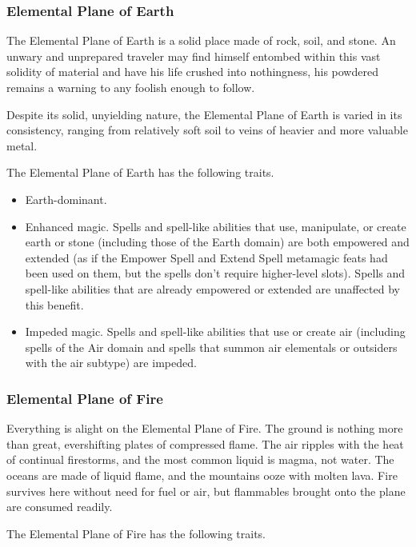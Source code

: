 \subsubsection{Elemental Plane of Earth}

The Elemental Plane of Earth is a solid place made of rock, soil, and stone. An 
unwary and unprepared traveler may find himself entombed within this vast solidity 
of material and have his life crushed into nothingness, his powdered remains a 
warning to any foolish enough to follow.

Despite its solid, unyielding nature, the Elemental Plane of Earth is varied in 
its consistency, ranging from relatively soft soil to veins of heavier and more 
valuable metal. 

The Elemental Plane of Earth has the following traits.

\begin{itemize}
\item Earth-dominant.
\item Enhanced magic. Spells and spell-like abilities that use, manipulate, or create 
earth or stone (including those of the Earth domain) are both empowered and extended 
(as if the Empower Spell and Extend Spell metamagic feats had been used on them, 
but the spells don't require higher-level slots). Spells and spell-like abilities 
that are already empowered or extended are unaffected by this benefit.
\item Impeded magic. Spells and spell-like abilities that use or create air (including 
spells of the Air domain and spells that summon air elementals or outsiders with 
the air subtype) are impeded.
\end{itemize}

\subsubsection{Elemental Plane of Fire}

Everything is alight on the Elemental Plane of Fire. The ground is nothing more 
than great, evershifting plates of compressed flame. The air ripples with the heat 
of continual firestorms, and the most common liquid is magma, not water. The oceans 
are made of liquid flame, and the mountains ooze with molten lava. Fire survives 
here without need for fuel or air, but flammables brought onto the plane are consumed 
readily. 

The Elemental Plane of Fire has the following traits.

